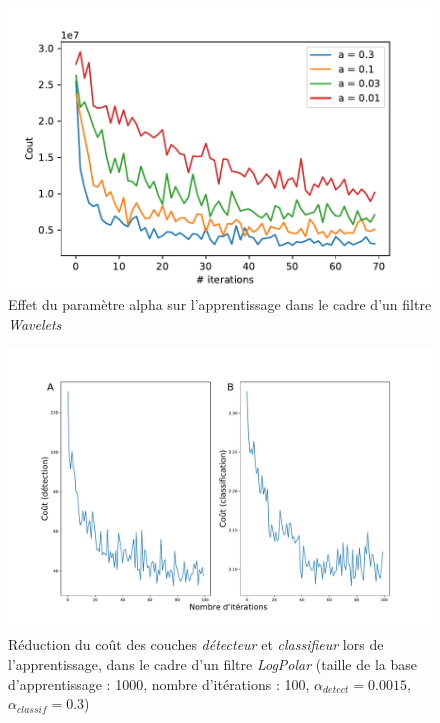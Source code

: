 \begin{figure}[th]
\centering
\includegraphics{Figures/Benchmarking_para_alpha}
\decoRule
\caption[Figure]{Effet du paramètre alpha sur l'apprentissage dans le cadre d'un filtre \textit{Wavelets}}
\label{fig:benchmark_alpha}
\end{figure}

\begin{figure}[th]
\centering
\includegraphics[scale=0.4]{Figures/logpolar_cost_learning}
\decoRule
\caption[Figure]{Réduction du coût des couches \textit{détecteur} et \textit{classifieur} lors de l'apprentissage, dans le cadre d'un filtre \textit{LogPolar} (taille de la base d'apprentissage :  1000, nombre d'itérations : 100, $\alpha_{detect}=0.0015$, $\alpha_{classif}=0.3$)}
\label{fig:logpolar_cost}
\end{figure}

